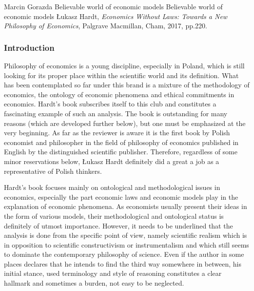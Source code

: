 \begin{recengenv}{Marcin Gorazda}
	{Believable world of economic models}
	{Believable world of economic models}
	{Łukasz Hardt, \textit{Economics Without Laws: Towards a New Philosophy of Economics}, Palgrave Macmillan, Cham, 2017,
		pp.220.}
	
	



\subsubsection{Introduction}
Philosophy of economics is a young discipline, especially in Poland, which is still looking for its proper place within
the scientific world and its definition. What has been contemplated so far under this brand is a mixture of the
methodology of economics, the ontology of economic phenomena and ethical commitments in economics. Hardt’s book
subscribes itself to this club and constitutes a fascinating example of such an analysis. The book is outstanding for
many reasons (which are developed further below), but one must be emphasized at the very beginning. As far as the
reviewer is aware it is the first book by Polish economist and philosopher in the field of philosophy of economics
published in English by the distinguished scientific publisher. Therefore, regardless of some minor reservations below,
Łukasz Hardt definitely did a great a job as a representative of Polish thinkers. 

Hardt’s book focuses mainly on ontological and methodological issues in economics, especially the part economic laws and
economic models play in the explanation of economic phenomena. As economists usually present their ideas in the form of
various models, their methodological and ontological status is definitely of utmost importance. However, it needs to be
underlined that the analysis is done from the specific point of view, namely scientific realism which is in opposition
to scientific constructivism or instrumentalism and which still seems to dominate the contemporary philosophy of
science.  Even if the author in some places declares that he intends to find the third way somewhere in between, his
initial stance, used terminology and style of reasoning constitutes a clear hallmark and sometimes a burden, not easy
to be neglected. 


\end{recengenv}
